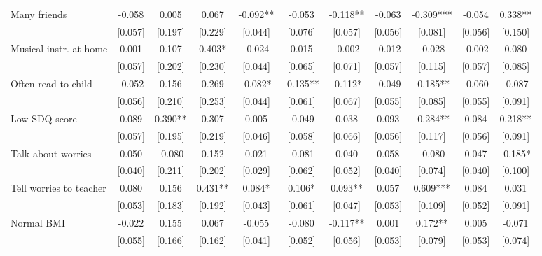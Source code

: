 \documentclass[12pt]{article}
\begin{document}
\begin{table}[ht]
\begin{center}
\begin{adjustbox}{width=1.2\textwidth,center=\textwidth}
\begin{tabular}{l*{10}{c}}
Many friends  & -0.058 & 0.005 & 0.067 & -0.092** & -0.053 & -0.118** & -0.063 & -0.309*** & -0.054 & 0.338** \\
 & [0.057] & [0.197] & [0.229] & [0.044] & [0.076] & [0.057] & [0.056] & [0.081] & [0.056] & [0.150] \\
Musical instr. at home & 0.001 & 0.107 & 0.403* & -0.024 & 0.015 & -0.002 & -0.012 & -0.028 & -0.002 & 0.080 \\
 & [0.057] & [0.202] & [0.230] & [0.044] & [0.065] & [0.071] & [0.057] & [0.115] & [0.057] & [0.085] \\
Often read to child & -0.052 & 0.156 & 0.269 & -0.082* & -0.135** & -0.112* & -0.049 & -0.185** & -0.060 & -0.087 \\
 & [0.056] & [0.210] & [0.253] & [0.044] & [0.061] & [0.067] & [0.055] & [0.085] & [0.055] & [0.091] \\
Low SDQ score  & 0.089 & 0.390** & 0.307 & 0.005 & -0.049 & 0.038 & 0.093 & -0.284** & 0.084 & 0.218** \\
 & [0.057] & [0.195] & [0.219] & [0.046] & [0.058] & [0.066] & [0.056] & [0.117] & [0.056] & [0.091] \\
Talk about worries  & 0.050 & -0.080 & 0.152 & 0.021 & -0.081 & 0.040 & 0.058 & -0.080 & 0.047 & -0.185* \\
 & [0.040] & [0.211] & [0.202] & [0.029] & [0.062] & [0.052] & [0.040] & [0.074] & [0.040] & [0.100] \\
Tell worries to teacher & 0.080 & 0.156 & 0.431** & 0.084* & 0.106* & 0.093** & 0.057 & 0.609*** & 0.084 & 0.031 \\
 & [0.053] & [0.183] & [0.192] & [0.043] & [0.061] & [0.047] & [0.053] & [0.109] & [0.052] & [0.091] \\
Normal BMI & -0.022 & 0.155 & 0.067 & -0.055 & -0.080 & -0.117** & 0.001 & 0.172** & 0.005 & -0.071 \\
 & [0.055] & [0.166] & [0.162] & [0.041] & [0.052] & [0.056] & [0.053] & [0.079] & [0.053] & [0.074] \\

\end{tabular}
\end{adjustbox}
\end{center}
\end{table}
\end{document}
